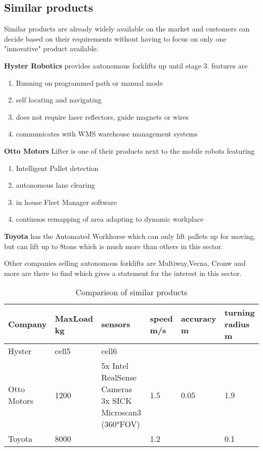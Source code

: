 \documentclass[../report.tex]{subfiles}
\begin{document}
\subsection{Similar products}
Similar products are already widely available on the market and customers can decide based on their requirements
without having to focus on only one "innovative" product available.

\textbf{Hyster Robotics} provides autonomous forklifts up until stage 3.
features are 
\begin{enumerate}
    \item Running on programmed path or manual mode
    \item self locating and navigating
    \item does not require laser reflectors, guide magnets or wires
    \item communicates with WMS warehouse management systems 
\end{enumerate}

\textbf{Otto Motors} Lifter is one of their products next to the mobile robots featuring
\begin{enumerate}
    \item Intelligent Pallet detection
    \item autonomous lane clearing
    \item in house Fleet Manager software
    \item continuos remapping of area adapting to dynamic workplace
\end{enumerate}

\textbf{Toyota} has the Automated Workhorse which can only lift pallets up for moving, but 
can lift up to 8tons which is much more than others in this sector.

Other companies selling autonomous forklifts are Multiway,Vecna, Cronw and more are there to find 
which gives a statement for the interest in this sector. 
\begin{table}[H]
    \begin{tabularx}{\linewidth}{| L || L | L | L | L | L | } 
        \hline
        Company& MaxLoad kg & sensors & speed m/s & accuracy m & turning radius m \\ 
        \hline
        \hline
        Hyster & cell5 & cell6 & & & \\ 
        \hline
        Otto Motors & 1200 & 5x Intel RealSense Cameras 3x SICK Microscan3 (360°FOV)& 1.5 & 0.05 & 1.9\\ 
        \hline
        Toyota & 8000 & & 1.2 & &0.1\\
        \hline
      \end{tabularx}
      \caption{Comparison of similar products}
\end{table}
\end{document}

